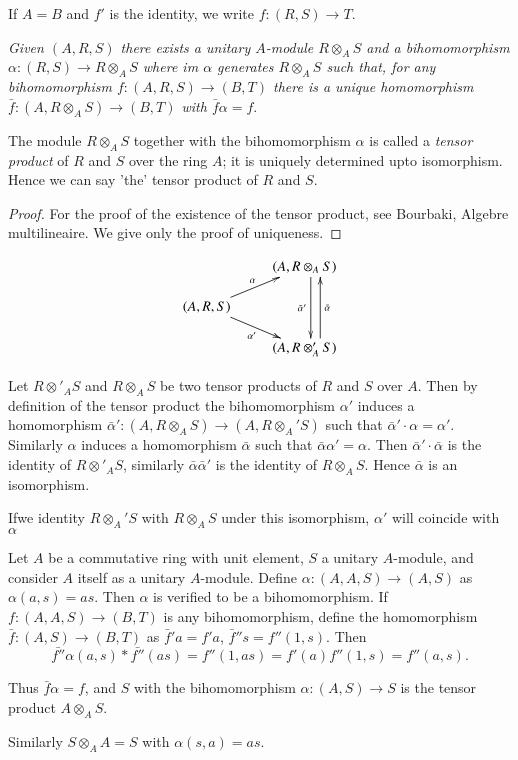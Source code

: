 If $A = B$ and $f'$ is the identity, we write $f : (R,S) \rightarrow T$.

\textit{Given $(A,R,S)$ there exists a unitary $A$-module $R \otimes_A
  S$ and a bihomomorphism $\alpha : (R,S) \rightarrow R \otimes_A S$
  where im $\alpha$ generates $R \otimes_A S$ such that, for any
  bihomomorphism $f : (A, R, S) \rightarrow (B,T)$ there is a unique
  homomorphism $\bar{f} : (A,R \otimes_A S) \rightarrow (B,T)$ with
  $\bar{f} \alpha = f$}. 

The module $R \otimes_A S$ together with the bihomomorphism $\alpha$
is called a \textit{tensor product} of $R$ and $S$ over the ring $A$;
it is uniquely determined upto isomorphism. Hence we can say 'the'
tensor product of $R$ and $S$. 

\begin{proof}%
For the proof of the existence of the tensor product, see Bourbaki,
Algebre multilineaire. We give only the proof of uniqueness. 
\end{proof}
\[
\xymatrix@R=0.5cm{
& (A,R \otimes_A S)\ar@<1ex>[dd]_{\bar{\alpha}'}\\
(A,R,S) \ar[ur]^{\alpha}\ar[dr]_{\alpha'} & \\
& (A,R\otimes'_AS) \ar@<-2.5ex>[uu]_{\bar{\alpha}}
}
\]

Let $R \otimes'_A S$ and $R \otimes_A S$ be two tensor products of $R$
and $S$ over $A$. Then by definition of the tensor product the
bihomomorphism $\alpha'$ induces a homomorphism $\bar{\alpha}' : (A, R
\otimes_A S) \rightarrow (A, R \otimes_A' S)$ such that
$\bar{\alpha}' \cdot  \alpha = \alpha'$. Similarly $\alpha$ induces a
homomorphism $\bar{\alpha}$ such that $\bar{\alpha}\alpha' =
\alpha$. Then $\bar{\alpha}' \cdot  \bar{\alpha}$ is the identity of $R
\otimes'_A S$, similarly $\bar{\alpha}\bar{\alpha}'$ is the identity
of $R \otimes_A S$. Hence $\bar{\alpha}$ is an isomorphism. 

If\pageoriginale we identity $R \otimes_A' S$ with  $R \otimes_A S$ under this
isomorphism, $\alpha'$ will coincide with $\alpha$ 

\begin{example*}
Let $A$ be a commutative ring  with unit element, $S$ a unitary
$A$-module, and consider $A$ itself as a unitary $A$-module. Define
$\alpha:(A,A,S) \to (A,S)$ as $\alpha(a,s)= a  s$. Then $\alpha$ is
verified to be a bihomomorphism. If $f : (A,A,S)\to (B,T)$ is any
bihomomorphism, define the  homomorphism $\bar{f}: (A,S) \to (B,T)$ as
$\bar{f}'a= f'a$, $\bar{f}''s = f''(1,s)$. Then  
$$
\bar{f''} \alpha(a,s) * \bar{f''} (as) = {f''} (1, as)=  f'(a)
    {f''}(1,s) = f''(a,s). 
$$
\end{example*}

\noindent
Thus $\bar{f} \alpha =f$, and $S$ with the bihomomorphism $\alpha
:(A,S)\to S$ is the tensor product $A \otimes_A S$. 

Similarly $S \otimes_A A = S$ with $\alpha(s,a)= as$.
